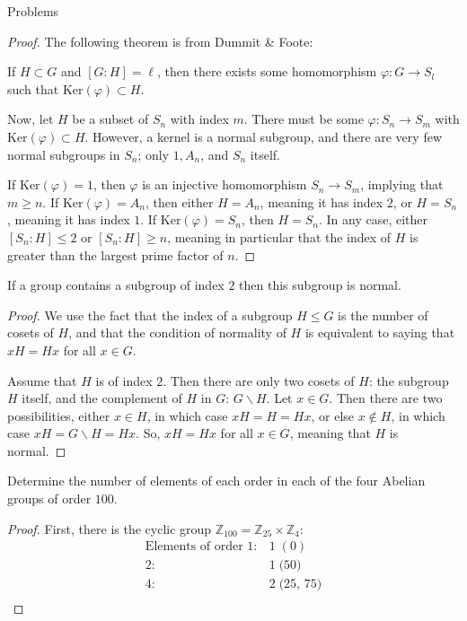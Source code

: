 \documentclass[12pt]{article}
\newcommand{\Z}{\mathbb{Z}}
\theoremstyle{definition}
\newenvironment{problem}[2][Problem]{\begin{trivlist}
\item[\hskip \labelsep {\bfseries #1}\hskip \labelsep {\bfseries #2.}]}{\end{trivlist}}
\begin{document}
\begin{section}{Problems}
\begin{problem}{6.5}
	\begin{proof}
		 The following theorem is from Dummit \& Foote: 
		 \par If $H \subset G$ and $[G : H] = \ell$, then there exists some homomorphism $\varphi: G \to S_l$ such that $\text{Ker}(\varphi) \subset H$.
		 \par Now, let $H$ be a subset of $S_n$ with index $m$. There must be some $\varphi : S_n \to S_m$ with $\text{Ker}(\varphi) \subset H$. However, a kernel is a normal subgroup, and there are very few normal subgroups in $S_n$; only $1, A_n$, and $S_n$ itself.
		 \par If $\text{Ker}(\varphi) = 1$, then $\varphi$ is an injective homomorphism $S_n \to S_m$, implying that $m \geq n$. If $\text{Ker}(\varphi) = A_n$, then either $H = A_n$, meaning it has index $2$, or $H = S_n$, meaning it has index $1$. If $\text{Ker}(\varphi) = S_n$, then $H = S_n$. In any case, either $[S_n : H] \leq 2$ or $[S_n : H] \geq n$, meaning in particular that the index of $H$ is greater than the largest prime factor of $n$.
	\end{proof}
\end{problem}
\begin{problem}{9}
	If a group contains a subgroup of index $2$ then this subgroup is normal.
	\begin{proof}
		We use the fact that the index of a subgroup $H \leq G$ is the number of cosets of $H$, and that the condition of normality of $H$ is equivalent to saying that $xH = Hx$ for all $x \in G$. 
		\par Assume that $H$ is of index $2$. Then there are only two cosets of $H$: the subgroup $H$ itself, and the complement of $H$ in $G$: $G \backslash H$. Let $x \in G$. Then there are two possibilities, either $x \in H$, in which case $xH = H = Hx$, or else $x \notin H$, in which case $xH  = G \backslash H = Hx$. So, $xH = Hx$ for all $x \in G$, meaning that $H$ is normal.
	\end{proof}
\end{problem}
\begin{problem}{12}
	Determine the number of elements of each order in each of the four Abelian groups of order $100$.
	\begin{proof}
	First, there is the cyclic group $\Z_{100} = \Z_{25} \times \Z_4$: 
	\begin{align*}
	    \text{Elements of order }1: & 1 \;(\text{$0$})\\
	    2 : &1 \;\text{($50$)}\\
	    4: &2 \;\text{($25$, $75$)}\\

\end{align*}
\end{proof}
\end{problem}
\end{section}
\end{document}
